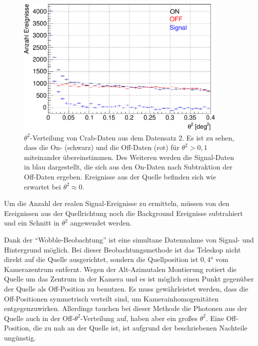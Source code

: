 \begin{figure}
    \centering
    \includegraphics[width=0.9\textwidth]{./Plots/04_MrkAnalyse/Datenset2/Crab_Theta2.pdf}
    \caption{$\theta^2$-Verteilung von Crab-Daten aus dem Datensatz 2. 
    Es ist zu sehen, dass die On- (schwarz) und die Off-Daten (rot) für $\theta^2 > 0,1$ miteinander übereinstimmen.
    Des Weiteren werden die Signal-Daten in blau dargestellt, die sich aus den On-Daten nach Subtraktion der Off-Daten ergeben.
    Ereignisse aus der Quelle befinden sich wie erwartet bei $\theta^2 \approx 0$.
    }
    \label{Crab_Theta2}
\end{figure}

Um die Anzahl der realen Signal-Ereignisse zu ermitteln, müssen von den Ereignissen aus der Quellrichtung noch die Background Ereignisse subtrahiert und ein Schnitt in $\theta^2$ angewendet werden.

Dank der \enquote{Wobble-Beobachtung} ist eine simultane Datennahme von Signal- und Hintergrund möglich.
Bei dieser Beobachtungsmethode ist das Teleskop nicht direkt auf die Quelle ausgerichtet, sondern die Quellposition ist $0,4°$ vom Kamerazentrum entfernt.
Wegen der Alt-Azimutalen Montierung rotiert die Quelle um das Zentrum in der Kamera und es ist möglich einen Punkt gegenüber der Quelle als Off-Position zu benutzen.
Es muss gewährleistet werden, dass die Off-Positionen symmetrisch verteilt sind, um Kamerainhomogenitäten entgegenzuwirken.
Allerdings tauchen bei dieser Methode die Photonen aus der Quelle auch in der Off-$\theta^2$-Verteilung auf, haben aber ein großes $\theta^2$.
Eine Off-Position, die zu nah an der Quelle ist, ist aufgrund der beschriebenen Nachteile ungünstig.\cite{Lichtkurve}

